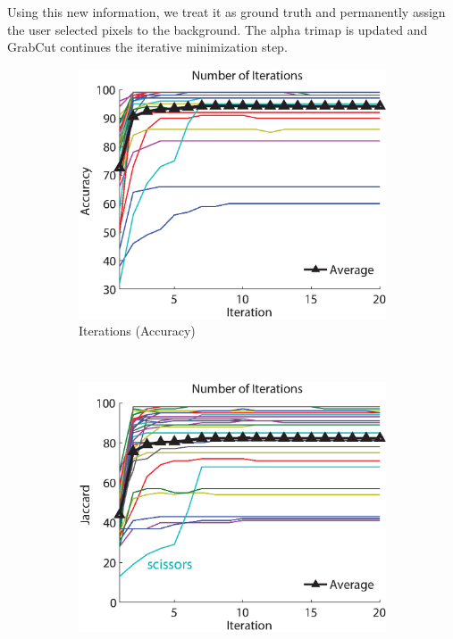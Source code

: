 \documentclass[10pt,twocolumn,letterpaper]{article}
\begin{document}
Using this new information, we treat it as ground truth and permanently assign the user selected pixels to the background. The alpha trimap is updated and GrabCut continues the iterative minimization step.

\begin{figure}[t]
\centering
\begin{subfigure}[b]{0.24\textwidth}
    \includegraphics[width=\textwidth]{figures/experiments/tuning/iterations_accuracy.eps}
    \caption{Iterations (Accuracy)}
    \label{fig:iterations_accuracy}
\end{subfigure}%
~
\begin{subfigure}[b]{0.24\textwidth}
    \includegraphics[width=\textwidth]{figures/experiments/tuning/iterations_jaccard.eps}

\end{subfigure}
\end{figure}
\end{document}
